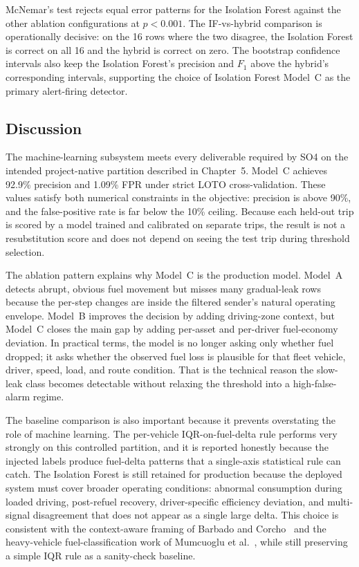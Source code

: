 McNemar's test rejects equal error patterns for the Isolation Forest against the other ablation configurations at $p < 0.001$. The IF-vs-hybrid comparison is operationally decisive: on the 16 rows where the two disagree, the Isolation Forest is correct on all 16 and the hybrid is correct on zero. The bootstrap confidence intervals also keep the Isolation Forest's precision and $F_1$ above the hybrid's corresponding intervals, supporting the choice of Isolation Forest Model~C as the primary alert-firing detector.

\FloatBarrier

\FloatBarrier
\subsection{Discussion}
The machine-learning subsystem meets every deliverable required by SO4 on the intended project-native partition described in Chapter~5. Model~C achieves 92.9\% precision and 1.09\% FPR under strict LOTO cross-validation. These values satisfy both numerical constraints in the objective: precision is above 90\%, and the false-positive rate is far below the 10\% ceiling. Because each held-out trip is scored by a model trained and calibrated on separate trips, the result is not a resubstitution score and does not depend on seeing the test trip during threshold selection.

The ablation pattern explains why Model~C is the production model. Model~A detects abrupt, obvious fuel movement but misses many gradual-leak rows because the per-step changes are inside the filtered sender's natural operating envelope. Model~B improves the decision by adding driving-zone context, but Model~C closes the main gap by adding per-asset and per-driver fuel-economy deviation. In practical terms, the model is no longer asking only whether fuel dropped; it asks whether the observed fuel loss is plausible for that fleet vehicle, driver, speed, load, and route condition. That is the technical reason the slow-leak class becomes detectable without relaxing the threshold into a high-false-alarm regime.

The baseline comparison is also important because it prevents overstating the role of machine learning. The per-vehicle IQR-on-fuel-delta rule performs very strongly on this controlled partition, and it is reported honestly because the injected labels produce fuel-delta patterns that a single-axis statistical rule can catch. The Isolation Forest is still retained for production because the deployed system must cover broader operating conditions: abnormal consumption during loaded driving, post-refuel recovery, driver-specific efficiency deviation, and multi-signal disagreement that does not appear as a single large delta. This choice is consistent with the context-aware framing of Barbado and Corcho~\cite{barbado2022interpretable} and the heavy-vehicle fuel-classification work of Mumcuoglu et al.~\cite{mumcuoglu2023fuel}, while still preserving a simple IQR rule as a sanity-check baseline.

